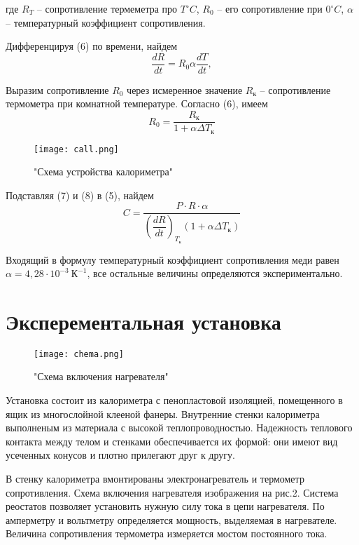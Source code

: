 где $R_{T}$ -- сопротивление термеметра про $T  ^{\circ}C$, $R_{0}$ -- его сопротивление при $0  ^{\circ}C$, $\alpha$ -- температурный коэффициент сопротивления. 

Дифференцируя (6) по времени, найдем
\begin{equation}
	\dfrac{dR}{dt} = R_{0}\alpha \dfrac{dT}{dt},
\end{equation}

Выразим сопротивление $R_{0}$ через исмеренное значение $R_{\text{к}}$ -- сопротивление термометра при комнатной температуре. Согласно (6), имеем
\begin{equation}
	R_{0} = \dfrac{R_{\text{к}}}{1 + \alpha \Delta T_{\text{к}}}
\end{equation}

\begin{figure}[h]
\texttt{[image: call.png]}
\caption{"Схема устройства калориметра"}
\label{fig:image}
\end{figure}

\newpage
Подставляя (7) и (8) в (5), найдем
\begin{equation}
	C = \dfrac{P\cdot R\cdot \alpha}{\left(\dfrac{dR}{dt}\right)_{T_{\text{к}}}(1 + \alpha \Delta T_{\text{к}})}
\end{equation}

 Входящий в формулу температурный коэффициент сопротивления меди равен $\alpha = 4,28 \cdot 10^{-3}~\text{К}^{-1}$, все остальные величины определяются экспериментально. 


\section{Эксперементальная установка}

\begin{wrapfigure}[8]{p}{0.30\linewidth} 
\texttt{[image: chema.png]}
\caption{"Схема включения нагревателя"}
\label{fig:image}
\end{wrapfigure}

Установка состоит из калориметра с пенопластовой изоляцией, помещенного в ящик из многослойной клееной фанеры. Внутренние стенки калориметра выполненым из материала с высокой теплопроводностью. Надежность теплового контакта между телом и стенками обеспечивается их формой: они имеют вид усеченных конусов и плотно прилегают друг к другу. 


В стенку калориметра вмонтированы электронагреватель и термометр сопротивления. Схема включения нагревателя изображения на рис.2. Система реостатов позволяет установить нужную силу тока в цепи нагревателя. По амперметру и вольтметру определяется мощность, выделяемая в нагревателе. Величина сопротивления термометра измеряется мостом постоянного тока.

